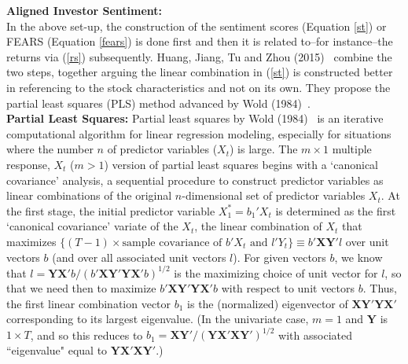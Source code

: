 \noindent\textbf{Aligned Investor Sentiment:} \\


In the above set-up, the construction of the sentiment scores (Equation \ref{st}) or FEARS (Equation \ref{fears}) is done first and then it is related to--for instance--the returns via (\ref{rs}) subsequently. Huang, Jiang, Tu and Zhou (2015)~\cite{huang} combine the two steps, together arguing the linear combination in (\ref{st}) is constructed better in referencing to the stock characteristics and not on its own. They propose the partial least squares (PLS) method advanced by Wold (1984)~\cite{wold}. \\


\noindent \textbf{Partial Least Squares:} Partial least squares by Wold (1984)~\cite{wold} is an iterative computational algorithm for linear regression modeling, especially for situations where the number $n$ of predictor variables ($X_t$) is large. The $m \times 1$ multiple response, $X_t$ ($m>1$) version of partial least squares begins with a `canonical covariance' analysis, a sequential procedure to construct predictor variables as linear combinations of the original $n$-dimensional set of predictor variables $X_t$. At the first stage, the initial predictor variable $X_{1}^*=b_1'X_t$ is determined as the first `canonical covariance' variate of the $X_t$, the linear combination of $X_t$ that maximizes $\{(T - 1) \times \text{sample covariance of } b'X_t \text{ and } l'Y_t \} \equiv b' \mathbf{XY}' l$ over unit vectors $b$ (and over all associated unit vectors $l$). For given vectors $b$, we know that $l=\mathbf{YX'} b/(b' \mathbf{XY'YX'}b)^{1/2}$ is the maximizing choice of unit vector for $l$, so that we need then to maximize $b' \mathbf{XY'YX'}b$ with respect to unit vectors $b$. Thus, the first linear combination vector $b_1$ is the (normalized) eigenvector of $\mathbf{XY'YX'}$ corresponding to its largest eigenvalue. (In the univariate case, $m=1$ and $\mathbf{Y}$ is $1 \times T$, and so this reduces to $b_1=\mathbf{XY'}/(\mathbf{YX'XY'})^{1/2}$ with associated ``eigenvalue" equal to $\mathbf{YX'XY'}$.)



